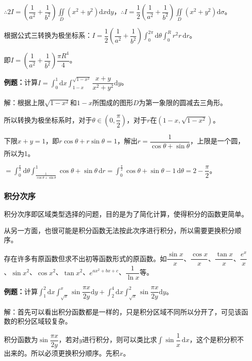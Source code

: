 \documentclass[UTF8, 12pt]{ctexart}
\begin{document}
$\therefore2I=\left(\dfrac{1}{a^2}+\dfrac{1}{b^2}\right)\displaystyle{\iint\limits_D(x^2+y^2)\textrm{d}x\textrm{d}y}$，$\therefore I=\dfrac{1}{2}\left(\dfrac{1}{a^2}+\dfrac{1}{b^2}\right)\displaystyle{\iint\limits_D(x^2+y^2)\textrm{d}\sigma}$。

根据公式三转换为极坐标系：$I=\dfrac{1}{2}\left(\dfrac{1}{a^2}+\dfrac{1}{b^2}\right)\int_0^{2\pi}\textrm{d}\theta\int_0^Rr^2r\,\textrm{d}r$。

即$I=\left(\dfrac{1}{a^2}+\dfrac{1}{b^2}\right)\dfrac{\pi R^4}{4}$。

\textbf{例题：}计算$I=\int_0^1\textrm{d}x\int_{1-x}^{\sqrt{1-x^2}}\dfrac{x+y}{x^2+y^2}\textrm{d}y$。

解：根据上限$\sqrt{1-x^2}$和$1-x$所围成的图形$D$为第一象限的圆减去三角形。

所以转换为极坐标系时，对于$\theta\in\left(0,\dfrac{\pi}{2}\right)$，对于$r$在$(1-x,\sqrt{1-x^2})$。

下限$x+y=1$，即$r\cos\theta+r\sin\theta=1$，解出$r=\dfrac{1}{\cos\theta+\sin\theta}$，上限是一个圆，所以为1。

$=\int_0^\frac{\pi}{2}\textrm{d}\theta\int_\frac{1}{\cos\theta+\sin\theta}^1\cos\theta+\sin\theta\,\textrm{d}r=\int_0^\frac{\pi}{2}\cos\theta+\sin\theta-1\,\textrm{d}\theta=2-\dfrac{\pi}{2}$。

\subsubsection{积分次序}

积分次序即区域类型选择的问题，目的是为了简化计算，使得积分的函数更简单。

从另一方面，也很可能是积分函数无法按此次序进行积分，所以需要更换积分顺序。

存在许多有原函数但求不出初等函数形式的原函数。如$\dfrac{\sin x}{x}$、$\dfrac{\cos x}{x}$、$\dfrac{\tan x}{x}$、$\dfrac{e^x}{x}$、$\sin x^2$、$\cos x^2$、$\tan x^2$、$e^{ax^2+bx+c}$、$\dfrac{1}{\ln x}$等。

\textbf{例题：}计算$\displaystyle{\int_1^2\textrm{d}x\int_{\sqrt{x}}^x\sin\dfrac{\pi x}{2y}\textrm{d}y+\int_2^4\textrm{d}x\int_{\sqrt{x}}^2\sin\dfrac{\pi x}{2y}\textrm{d}y}$。

解：首先可以看出积分函数都是一样的，只是积分区域不同所以分开了，可见该函数的积分区域较复杂。

积分函数为$\sin\dfrac{\pi x}{2y}$，若对$y$进行积分，则可以类比求$\displaystyle{\int\sin\dfrac{1}{x}\,\textrm{d}x}$，这个是积分积不出来的。所以必须更换积分顺序。先积$x$。
\end{document}
